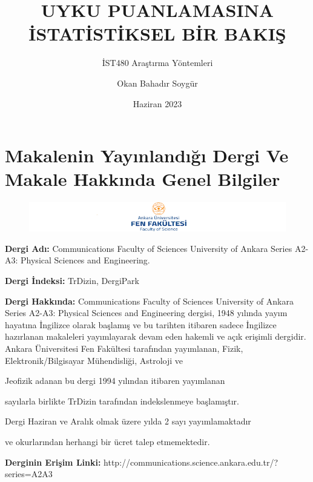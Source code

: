 \documentclass {beamer}
\title{UYKU PUANLAMASINA İSTATİSTİKSEL BİR BAKIŞ}
\author{Okan Bahadır Soygür}
\subtitle{İST480 Araştırma Yöntemleri}
\date{Haziran 2023}
\begin{document}
\maketitle

\section{Makalenin Yayınlandığı Dergi Ve Makale Hakkında Genel Bilgiler}
\begin{figure}[h]
    \centering
    \includegraphics[width=0.80\linewidth]{aüff.png}
    \label{fig:enter-label}
\end{figure}
\textbf{Dergi Adı:}  Communications Faculty of Sciences University of Ankara Series A2-A3: Physical Sciences and Engineering.


\textbf{Dergi İndeksi:} TrDizin, DergiPark

\textbf{Dergi Hakkında:} Communications Faculty of Sciences University of Ankara Series A2-A3: Physical Sciences and Engineering dergisi, 1948 yılında yayım hayatına İngilizce olarak başlamış ve bu tarihten itibaren sadece İngilizce hazırlanan makaleleri yayımlayarak devam eden hakemli ve açık erişimli dergidir. Ankara Üniversitesi Fen Fakültesi tarafından yayımlanan, Fizik, Elektronik/Bilgisayar Mühendisliği, Astroloji ve

Jeofizik adanan bu dergi 1994 yılından itibaren yayımlanan 


sayılarla birlikte TrDizin tarafından indekslenmeye başlamıştır. 

Dergi Haziran ve Aralık olmak üzere yılda 2 sayı yayımlamaktadır 


ve okurlarından herhangi bir ücret talep etmemektedir.



\textbf{Derginin Erişim Linki:} http://communications.science.ankara.edu.tr/?series=A2A3
\end{document}
